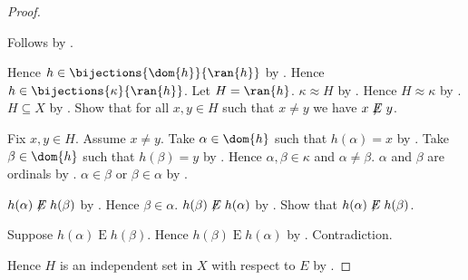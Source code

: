 \begin{proof}
\begin{subproof}
        Follows by .
    \end{subproof}
    Hence $h\in\bijections{\dom{h}}{\ran{h}}$ by
        .
    Hence $h\in\bijections{\kappa}{\ran{h}}$.
    Let $H=\ran{h}$.
    $\kappa\approx H$ by .
    Hence $H\approx\kappa$ by .
    $H\subseteq X$ by .
    Show that for all $x,y\in H$ such that $x\neq y$ we have
        $x\not\mathrel{E}y$.
    \begin{subproof}
        Fix $x,y\in H$.
        Assume $x\neq y$.
        Take $\alpha\in\dom{h}$ such that $h(\alpha)=x$ by
            .
        Take $\beta\in\dom{h}$ such that $h(\beta)=y$ by
            .
        Hence $\alpha,\beta\in\kappa$ and $\alpha\neq\beta$.
        $\alpha$ and $\beta$ are ordinals by
            .
        $\alpha\in\beta$ or $\beta\in\alpha$ by
            .
        \begin{byCase}
                $h(\alpha)\not\mathrel{E}h(\beta)$ by
                    .
                Hence $\beta\in\alpha$.
                $h(\beta)\not\mathrel{E}h(\alpha)$ by
                    .
                Show that $h(\alpha)\not\mathrel{E}h(\beta)$.
                \begin{subproof}
                    Suppose $h(\alpha)\mathrel{E}h(\beta)$.
                    Hence $h(\beta)\mathrel{E}h(\alpha)$ by
                        .
                    Contradiction.
                \end{subproof}
        \end{byCase}
    \end{subproof}
    Hence $H$ is an independent set in $X$ with respect to $E$ by
        .
\end{proof}
